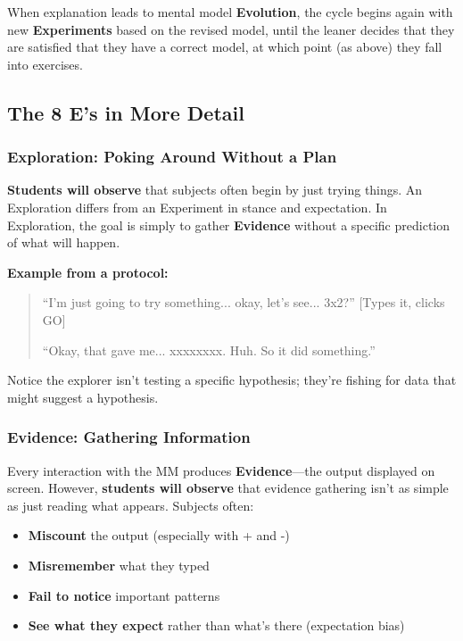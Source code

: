 \documentclass[12pt,letterpaper]{article}
\begin{document}
When explanation leads to mental model \textbf{Evolution}, the cycle begins again with new \textbf{Experiments} based on the revised model, until the leaner decides that they are satisfied that they have a correct model, at which point (as above) they fall into exercises.  

\subsection{The 8 E's in More Detail}
\subsubsection{Exploration: Poking Around Without a Plan}

\textbf{Students will observe} that subjects often begin by just trying things. An Exploration differs from an Experiment in stance and expectation. In Exploration, the goal is simply to gather \textbf{Evidence} without a specific prediction of what will happen.

\textbf{Example from a protocol:}
\begin{quote}
``I'm just going to try something... okay, let's see... 3x2?'' [Types it, clicks GO]

``Okay, that gave me... xxxxxxxx. Huh. So it did something.''
\end{quote}

Notice the explorer isn't testing a specific hypothesis; they're fishing for data that might suggest a hypothesis.

\subsubsection{Evidence: Gathering Information}

Every interaction with the MM produces \textbf{Evidence}—the output displayed on screen. However, \textbf{students will observe} that evidence gathering isn't as simple as just reading what appears. Subjects often:

\begin{itemize}
\item \textbf{Miscount} the output (especially with + and -)
\item \textbf{Misremember} what they typed
\item \textbf{Fail to notice} important patterns
\item \textbf{See what they expect} rather than what's there (expectation bias)
\end{itemize}
\end{document}
